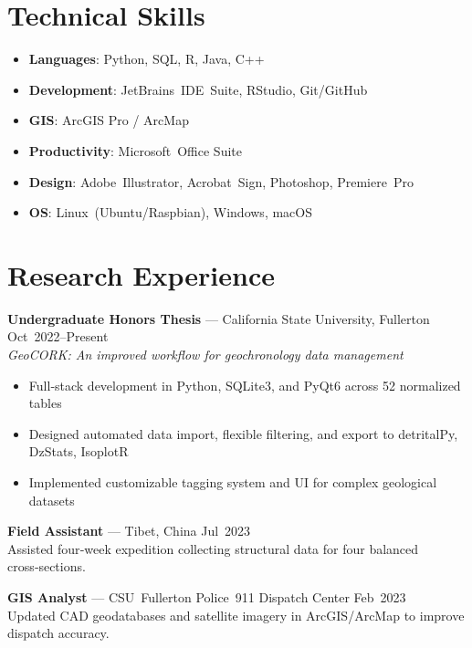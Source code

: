 \documentclass[10pt]{res}
\begin{document}
\section{Technical Skills}
\begin{itemize}[noitemsep, topsep=2pt]
  \item \textbf{Languages}: Python, SQL, R, Java, C++
  \item \textbf{Development}: JetBrains IDE Suite, RStudio, Git/GitHub
  \item \textbf{GIS}: ArcGIS Pro / ArcMap
  \item \textbf{Productivity}: Microsoft Office Suite
  \item \textbf{Design}: Adobe Illustrator, Acrobat Sign, Photoshop, Premiere Pro
  \item \textbf{OS}: Linux (Ubuntu/Raspbian), Windows, macOS
\end{itemize}

\section{Research Experience}
\textbf{Undergraduate Honors Thesis} — California State University, Fullerton \hfill Oct 2022–Present\\
\emph{GeoCORK: An improved workflow for geochronology data management}
\begin{itemize}[leftmargin=*, noitemsep]
  \item Full‑stack development in Python, SQLite3, and PyQt6 across 52 normalized tables
  \item Designed automated data import, flexible filtering, and export to detritalPy, DzStats, IsoplotR
  \item Implemented customizable tagging system and UI for complex geological datasets
\end{itemize}

\textbf{Field Assistant} — Tibet, China \hfill Jul 2023\\
Assisted four‑week expedition collecting structural data for four balanced cross‑sections.

\textbf{GIS Analyst} — CSU Fullerton Police 911 Dispatch Center \hfill Feb 2023\\
Updated CAD geodatabases and satellite imagery in ArcGIS/ArcMap to improve dispatch accuracy.
\end{document}
